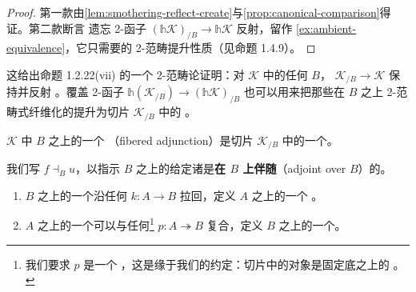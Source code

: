 \begin{proof}
第一款由\cref{lem:smothering-reflect-create}与\cref{prop:canonical-comparison}得证。第二款断言 %
遗忘 2-函子 $(\mathbb{h}\mathcal{K})_{/B}\to\mathbb{h}\mathcal{K}$ 反射\trEquivalence，留作 %
\cref{ex:ambient-equivalence}，它只需要\trIsofibration{}的 2-范畴提升性质（见命题 1.4.9）。
\end{proof}
这给出命题 1.2.22(vii) 的一个 2-范畴论证明：对\trInfinityCosmos{} $\mathcal{K}$ 中的任何%
\trInfinityCategory{} $B$，\trForgetfulFunctor{} $\mathcal{K}_{/B}\to\mathcal{K}$ 保持并反射%
\trEquivalence。覆盖 2-函子 $\mathbb{h}(\mathcal{K}_{/B})\to(\mathbb{h}\mathcal{K})_{/B}$ 也可以用来把那些在 %
$B$ 之上 2-范畴式纤维化的\trAdjunction{}提升为切片\trInfinityCosmos{} $\mathcal{K}_{/B}$ 中的 %
\trAdjunction。

\begin{definition}[\trFiberedAdjunction]\label{def:fibered-adjunction}
\trInfinityCosmos{} $\mathcal{K}$ 中\trInfinityCategory{} $B$ 之上的一个\textbf{\trFiberedAdjunction}%
（fibered adjunction）是切片\trInfinityCosmos{} $\mathcal{K}_{/B}$ 中的一个\trAdjunction。
\begin{center}
\end{center}
\end{definition}

我们写 $f\dashv_{B}u$，以指示 $B$ 之上的给定诸\trFunctor{}是\textbf{在 $B$ 上伴随}（adjoint over %
$B$）的。

\begin{lemma}\label{lem:fibered-adjunction-pullback-projection}
\begin{enumerate}[label=(\roman*)]
\item $B$ 之上的一个\trFiberedAdjunction{}沿任何\trFunctor{} $k\colon A\to B$ 拉回，定义 $A$ 之上的一个 %
\trFiberedAdjunction。
\item $A$ 之上的一个\trFiberedAdjunction{}可以与任何\trIsofibration\footnote{我们要求 $p$ 是一个 %
\trIsofibration，这是缘于我们的约定：切片\trInfinityCosmos{}中的对象是固定底之上的%
\trIsofibration。} $p\colon A\twoheadrightarrow B$ 复合，定义 $B$ 之上的一个\trFiberedAdjunction。
\end{enumerate}
\end{lemma}

